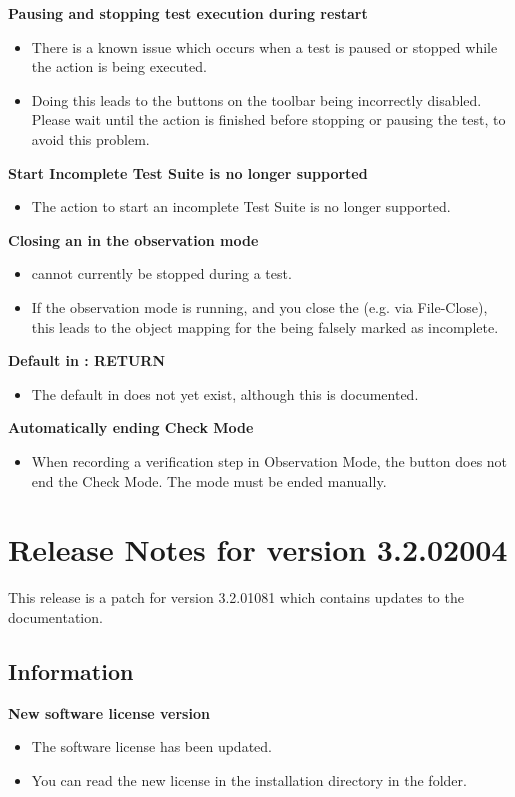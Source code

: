 \textbf{Pausing and stopping test execution during restart \gdaut{}}
\begin{itemize}
\item There is a known issue which occurs when a test is paused or stopped while the action  is being executed. 
\item Doing this leads to the buttons on the toolbar being incorrectly disabled. Please wait until the action is finished before stopping or pausing the test, to avoid this problem.
\end{itemize}

\textbf{Start Incomplete Test Suite is no longer supported}
\begin{itemize}
\item The action to start an incomplete Test Suite is no longer supported. 
\end{itemize}

\textbf{Closing an \gdaut{} in the observation mode}
\begin{itemize}
\item \gdauts{} cannot currently be stopped during a test. 
\item If the observation mode is running, and you close the \gdaut{} (e.g. via File-Close), this leads to the object mapping for the \gdcase{} being falsely marked as incomplete. 
\end{itemize}

\textbf{Default \gdehandlers{} in \gdsuites{}: RETURN}
\begin{itemize}
\item The  default \gdehandler{} in \gdsuites{} does not yet exist, although this is documented.
\end{itemize}

\textbf{Automatically ending Check Mode}
\begin{itemize}
\item When recording a verification step in Observation Mode, the button  does not end the Check Mode. The mode must be ended manually.
\end{itemize}

\clearpage
\makeatletter
\section{Release Notes for version 3.2.02004}
\makeatother
This release is a patch for version 3.2.01081 which contains updates to the documentation. 
\subsection{Information}
\textbf{New software license version}
\begin{itemize}
\item The software license has been updated.
\item You can read the new license in the installation directory in the  folder. 
\end{itemize}



